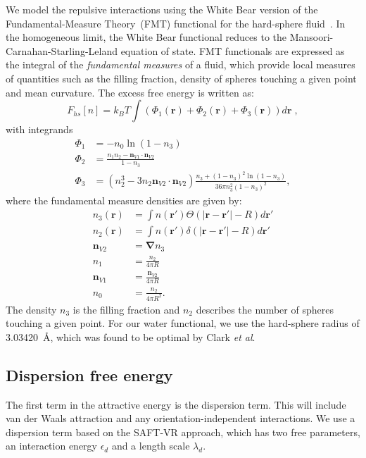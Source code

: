 \documentclass[letterpaper,twocolumn,amsmath,amssymb,prb]{revtex4-1}
\newcommand{\xx}{\textbf{r}}
\begin{document}
We model the repulsive interactions using the White Bear version of
the Fundamental-Measure Theory~(FMT) functional for the hard-sphere
fluid~\cite{roth2002whitebear}.  In the homogeneous limit, the White
Bear functional reduces to the Mansoori-Carnahan-Starling-Leland
equation of state.  FMT functionals are expressed as the integral of
the \emph{fundamental measures} of a fluid, which provide local
measures of quantities such as the filling fraction, density of
spheres touching a given point and mean curvature.  The excess free
energy is written as:
\begin{equation}
F_{hs}[n] = k_B T \int (\Phi_1(\xx) + \Phi_2(\xx) + \Phi_3(\xx)) d\xx \; ,
\end{equation}
with integrands
\begin{align}
\Phi_1 &= -n_0 \ln\left( 1 - n_3\right)\\
\Phi_2 &= \frac{n_1 n_2 - \mathbf{n}_{V1} \cdot\mathbf{n}_{V2}}{1-n_3} \\
\Phi_3 &= (n_2^3 - 3n_2 \mathbf{n}_{V2} \cdot \mathbf{n}_{V2})
  \frac{
    n_3 + (1-n_3)^2\ln(1-n_3)
  }{
    36\pi n_3^2\left( 1 - n_3 \right)^2
  } ,
\end{align}
where the fundamental measure densities are given by:
\begin{align}
  n_3(\xx) &= \int n(\xx') \Theta(\left|\xx - \xx'\right| - R) d\xx' \\
  n_2(\xx) &= \int n(\xx') \delta(\left|\xx - \xx'\right| - R) d\xx'
  \\
  \mathbf{n}_{V2} &= \mathbf{\nabla} n_3 \\
  n_1 &= \frac{n_2}{4\pi R}\\
  \mathbf{n}_{V1} &= \frac{\mathbf{n}_{V2}}{4\pi R}\\
  n_0 &= \frac{n_2}{4\pi R^2}.
\end{align}
The density $n_3$ is the filling fraction and $n_2$ describes the number
of spheres touching a given point. For our water functional, we use the 
hard-sphere radius of
3.03420~\AA, which was found to be optimal by Clark
\emph{et al}.\cite{clark2006developing}

\newcommand\etadisp{\ensuremath{\eta_\textit{d}}}
\newcommand\epsilondisp{\ensuremath{\epsilon_\textit{d}}}
\newcommand\epsilonassoc{\ensuremath{\epsilon_\textit{a}}}
\newcommand\kappaassoc{\ensuremath{\kappa_\textit{a}}}
\newcommand\lambdadisp{\ensuremath{\lambda_\textit{d}}}
\newcommand\lscale{\ensuremath{s_d}}
\subsection{Dispersion free energy}
The first term in the attractive energy is the dispersion term.  This
will include van der Waals attraction and any orientation-independent
interactions. We use a
dispersion term based on the SAFT-VR
approach\cite{gil-villegas-1997-SAFT-VR}, which has two free
parameters, an interaction energy $\epsilondisp$ and a
length scale $\lambdadisp$.
\end{document}
